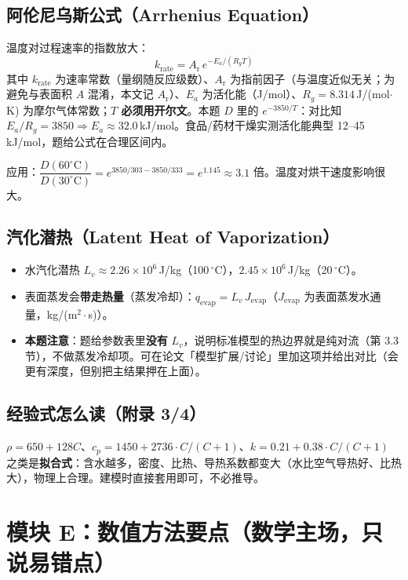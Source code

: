 \documentclass[12pt,a4paper]{ctexart}
\begin{document}
\subsection{阿伦尼乌斯公式（Arrhenius Equation）}
温度对过程速率的指数放大：
\begin{equation}
k_{\mathrm{rate}}=A_{\mathrm{r}}\,e^{-E_a/(R_g T)}
\end{equation}
其中 $k_{\mathrm{rate}}$ 为速率常数（量纲随反应级数）、$A_{\mathrm{r}}$ 为指前因子（与温度近似无关；为避免与表面积 $A$ 混淆，本文记 $A_{\mathrm{r}}$）、$E_a$ 为活化能（J/mol）、$R_g=8.314$\,J/(mol$\cdot$K) 为摩尔气体常数；\textbf{$T$ 必须用开尔文}。本题 $D$ 里的 $e^{-3850/T}$：对比知 $E_a/R_g=3850\Rightarrow E_a\approx32.0$\,kJ/mol。食品/药材干燥实测活化能典型 12--45\,kJ/mol，题给公式在合理区间内。

应用：$\dfrac{D(60^\circ\mathrm{C})}{D(30^\circ\mathrm{C})}=e^{3850/303-3850/333}=e^{1.145}\approx3.1$ 倍。温度对烘干速度影响很大。

\subsection{汽化潜热（Latent Heat of Vaporization）}
\begin{itemize}
\item 水汽化潜热 $L_v\approx2.26\times10^6$\,J/kg（100\,$^\circ$C），$2.45\times10^6$\,J/kg（20\,$^\circ$C）。
\item 表面蒸发会\textbf{带走热量}（蒸发冷却）：$q_{\mathrm{evap}}=L_v\,J_{\mathrm{evap}}$（$J_{\mathrm{evap}}$ 为表面蒸发水通量，kg/(m$^2\cdot$s)）。
\item \textbf{本题注意}：题给参数表里\textbf{没有} $L_v$，说明标准模型的热边界就是纯对流（第 3.3 节），不做蒸发冷却项。可在论文「模型扩展/讨论」里加这项并给出对比（会更有深度，但别把主结果押在上面）。
\end{itemize}

\subsection{经验式怎么读（附录 3/4）}
$\rho=650+128C$、$c_p=1450+2736\cdot C/(C+1)$、$k=0.21+0.38\cdot C/(C+1)$ 之类是\textbf{拟合式}：含水越多，密度、比热、导热系数都变大（水比空气导热好、比热大），物理上合理。建模时直接套用即可，不必推导。

\section{模块 E：数值方法要点（数学主场，只说易错点）}
\end{document}
